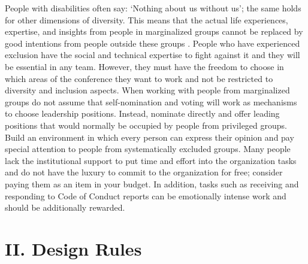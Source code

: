 \documentclass[10pt,letterpaper]{article}
\begin{document}
People with disabilities often say: `Nothing about us without us'; the same holds for other dimensions of diversity. This means that the actual life experiences, expertise, and insights from people in marginalized groups cannot be replaced by good intentions from people outside these groups \cite{costanzachockDesign2020}.
People who have experienced exclusion have the social and technical expertise to fight against it and they will be essential in any team.%
However, they must have the freedom to choose in which areas of the conference they want to work and not be restricted to diversity and inclusion aspects. 
When working with people from marginalized groups do not assume that self-nomination and voting will work as mechanisms to choose leadership positions. Instead, nominate directly and offer leading positions that would normally be occupied by people from privileged groups.
Build an environment in which every person can express their opinion and pay special attention to people from systematically excluded groups.
Many people lack the institutional support to put time and effort into the organization tasks and do not have the luxury to commit to the organization for free; consider paying them as an item in your budget.  
In addition, tasks such as receiving and responding to Code of Conduct reports can be emotionally intense work and should be additionally rewarded.



\section*{II. Design Rules}
\end{document}
